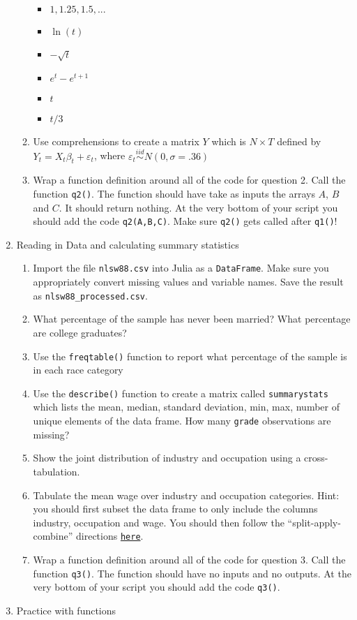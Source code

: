 \documentclass[12pt,english]{article}
\begin{document}
\begin{enumerate}
\begin{enumerate}
\begin{itemize}
\item $1,1.25,1.5,...$
\item $\ln\left(t\right)$
\item $-\sqrt{t}$
\item $e^{t}-e^{t+1}$
\item $t$
\item $t/3$
\end{itemize}
\item Use comprehensions to create a matrix $Y$ which is $N\times T$ defined by $Y_{t}=X_{t}\beta_{t}+\varepsilon_{t}$, where $\varepsilon_{t}\overset{iid}{\sim}N\left(0,\sigma=.36\right)$
\item Wrap a function definition around all of the code for question 2. Call the function \texttt{q2()}. The function should have take as inputs the arrays $A$, $B$ and $C$. It should return nothing. At the very bottom of your script you should add the code \texttt{q2(A,B,C)}. Make sure \texttt{q2()} gets called after \texttt{q1()}!
\end{enumerate}
\item Reading in Data and calculating summary statistics

\begin{enumerate}
\item Import the file \texttt{nlsw88.csv} into Julia as a \texttt{DataFrame}. Make sure you appropriately convert missing values and variable names. Save the result as \texttt{nlsw88\_processed.csv}.
\item What percentage of the sample has never been married? What percentage are college graduates?
\item Use the \texttt{freqtable()} function to report what percentage of the sample is in each race category
\item Use the \texttt{describe()} function to create a matrix called \texttt{summarystats} which lists the mean, median, standard deviation, min, max, number of unique elements of the data frame. How many \texttt{grade} observations are missing?
\item Show the joint distribution of industry and occupation using a cross-tabulation.
\item Tabulate the mean wage over industry and occupation categories. Hint: you should first subset the data frame to only include the columns industry, occupation and wage. You should then follow the ``split-apply-combine'' directions \href{https://juliadata.github.io/DataFrames.jl/stable/man/split_apply_combine/}{\texttt{here}}.
\item Wrap a function definition around all of the code for question 3. Call the function \texttt{q3()}. The function should have no inputs and no outputs. At the very bottom of your script you should add the code \texttt{q3()}.
\end{enumerate}
\item Practice with functions


\end{enumerate}
\end{document}
